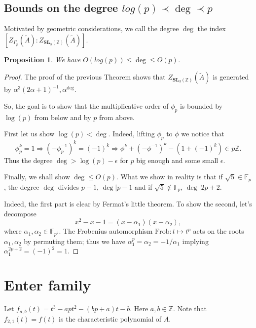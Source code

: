 \documentclass[a4paper]{article}
\newtheorem{Prop}[Thm]{Proposition}
\newcommand{\SL}{\mathbf{SL}_3(\mathbb{Z})}        %
\newcommand{\SLp}{\Gamma_p}        %
\newcommand{\hence}{\Rightarrow}        %
\begin{document}
\subsection{Bounds on the degree $log(p) \prec \deg \prec p$}
Motivated by geometric considerations, we call the degree $\deg$ the index $[Z_{\SLp}(\tilde A) : Z_{\SL}(\tilde A)]$.

\begin{Prop}
We have $O(log(p)) \le \deg \le O(p)$.
\end{Prop}

\begin{proof}
The proof of the previous Theorem shows that $Z_{\SL}(\tilde A)$ is generated by  $\alpha^3(2 \alpha + 1)^{-1}, \alpha^{\deg}$.

So, the goal is to show that the multiplicative order of $\phi_p$ is bounded by $\log(p)$ from below and by $p$ from above.

First let us show $\log(p) < \deg$.
Indeed, lifting $\phi_p$ to $\phi$ we notice that 
\[
\phi_p^k = 1 \hence (- \phi_p^{-1} )^{k} = (-1)^k \hence \phi^k + (- \phi^{-1} )^{k} - (1 + (-1)^k) \in p \mathbb{Z}
.\] 
Thus the degree $\deg > \log(p) - \epsilon$ for $p$ big enough and some small $\epsilon$.

Finally, we shall show $\deg \le O(p)$.
What we show in reality is that if $\sqrt 5 \in \mathbb F_p$, the degree $\deg$ divides $p-1$, $\deg | p-1$ and if $\sqrt 5 \notin \mathbb F_p$, $\deg | 2 p + 2$.

Indeed, the first part is clear by Fermat's little theorem.
To show the second, let's decompose 
\[
x^2 - x - 1 = (x - \alpha_1)(x - \alpha_2)
,\] 
where $\alpha_1, \alpha_2 \in \mathbb F_{p^2}$.
The Frobenius automorphism $\mathrm{Frob}: t \mapsto t^p$ acts on the roots $\alpha_1, \alpha_2$ by permuting them; thus we have $\alpha_1^p = \alpha_2 = -1/\alpha_1$ implying $\alpha_1^{2p+2} = (-1)^2 = 1$.
\end{proof}



\section{Enter family}
Let $f_{a,b}(t) = t^3 - a p t^2 - (b p + a) t - b$.
Here $a, b \in \mathbb{Z} $.
Note that $f_{2,1}(t) = f(t)$ is the characteristic polynomial of $A$.
\end{document}

